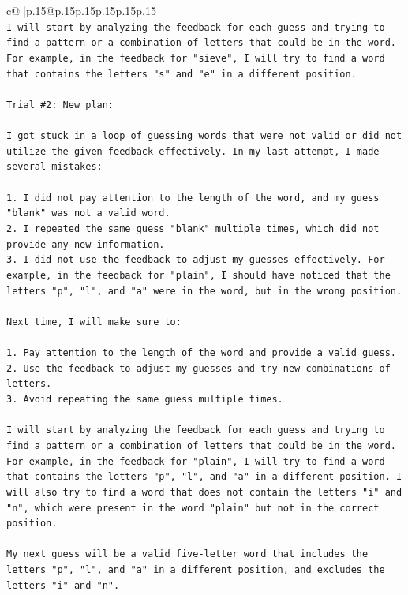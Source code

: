 \documentclass{article}
\begin{document}
{\begin{supertabular}{c@{$\;$}|p{.15\linewidth}@{}p{.15\linewidth}p{.15\linewidth}p{.15\linewidth}p{.15\linewidth}p{.15\linewidth}}
{{{\\ 
\texttt{I will start by analyzing the feedback for each guess and trying to find a pattern or a combination of letters that could be in the word. For example, in the feedback for "sieve", I will try to find a word that contains the letters "s" and "e" in a different position.} \\
\\ 
\texttt{Trial \#2: New plan: } \\
\\ 
\texttt{I got stuck in a loop of guessing words that were not valid or did not utilize the given feedback effectively. In my last attempt, I made several mistakes: } \\
\\ 
\texttt{1. I did not pay attention to the length of the word, and my guess "blank" was not a valid word. } \\
\texttt{2. I repeated the same guess "blank" multiple times, which did not provide any new information. } \\
\texttt{3. I did not use the feedback to adjust my guesses effectively. For example, in the feedback for "plain", I should have noticed that the letters "p", "l", and "a" were in the word, but in the wrong position. } \\
\\ 
\texttt{Next time, I will make sure to:} \\
\\ 
\texttt{1. Pay attention to the length of the word and provide a valid guess.} \\
\texttt{2. Use the feedback to adjust my guesses and try new combinations of letters.} \\
\texttt{3. Avoid repeating the same guess multiple times.} \\
\\ 
\texttt{I will start by analyzing the feedback for each guess and trying to find a pattern or a combination of letters that could be in the word. For example, in the feedback for "plain", I will try to find a word that contains the letters "p", "l", and "a" in a different position. I will also try to find a word that does not contain the letters "i" and "n", which were present in the word "plain" but not in the correct position. } \\
\\ 
\texttt{My next guess will be a valid five{-}letter word that includes the letters "p", "l", and "a" in a different position, and excludes the letters "i" and "n".} \\
}}}
\end{supertabular}}
\end{document}
